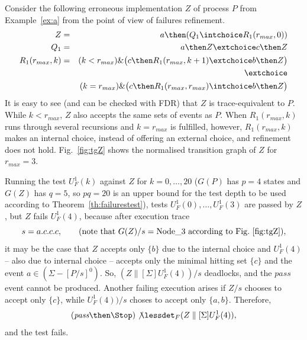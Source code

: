 \begin{example}
\label{ex:uf1tests} Consider the following erroneous implementation $Z$ of
process $P$ from Example~\ref{ex:a} from the point of view of failures
refinement.
\begin{eqnarray*}
Z & = & a \then (Q_1 \intchoice R_1(r_{max},0))
\\
Q_1 & = & a\then Z \extchoice c\then Z
\\
R_1(r_{max},k) & = & (k < r_{max}) \& \big( c\then R_1(r_{max},k+1)\extchoice b\then Z  \big)
\\ & & \extchoice
\\ & & (k = r_{max}) \& \big( c\then R_1(r_{max},r_{max})\intchoice b\then Z  \big)
\end{eqnarray*}
It is easy to see (and can be checked with FDR) that $Z$ is trace-equivalent
to $P$. While $k < r_{max}$, $Z$ also accepts the same sets of events as $P$.
When $R_1(r_{max},k)$ runs through several recursions and $k = r_{max}$ is
fulfilled, however, $R_1(r_{max},k)$ makes an internal choice, instead of
offering an external choice, and refinement does not hold.
Fig.~\ref{fig:tgZ} shows the normalised transition graph of $Z$ for $r_{max}
= 3$.

Running the test $U_F^1(k)$ against $Z$ for $k=0,\dots,20$ ($G(P)$ has $p =
4$ states and $G(Z)$ has $q=5$, so $pq=20$ is an upper bound for the test
depth to be used according to Theorem~\ref{th:failurestest}), tests
$U_F^1(0),\dots, U_F^1(3)$ are passed by $Z$, but $Z$ fails $U_F^1(4)$,
because after  execution trace
\[
s = a.c.c.c, \qquad\text{(note that $G(Z)/s = \text{Node\_3}$ according to Fig.~\ref{fig:tgZ})},
\]
it may be the case that $Z$ accepts only $\{b\}$ due to the internal choice
and $U_F^1(4)$ -- also due to internal choice -- accepts only the minimal
hitting set $\{ c \}$ and the event $a\in (\Sigma - [P/s]^0)$. So,
$(Z\parallel[\Sigma] U_F^1(4))/s$ deadlocks, and the $pass$ event cannot be
produced. Another failing execution arises if $Z/s$ chooses to accept only
$\{c \}$, while $U_F^1(4))/s$ choses to accept only $\{a,b\}$. Therefore,
\[
(\epass\then \Stop)\not\lessdet_F  (Z\parallel[\Sigma] U_F^1(4)),
\]
and the test fails.
\xbox
\end{example}




